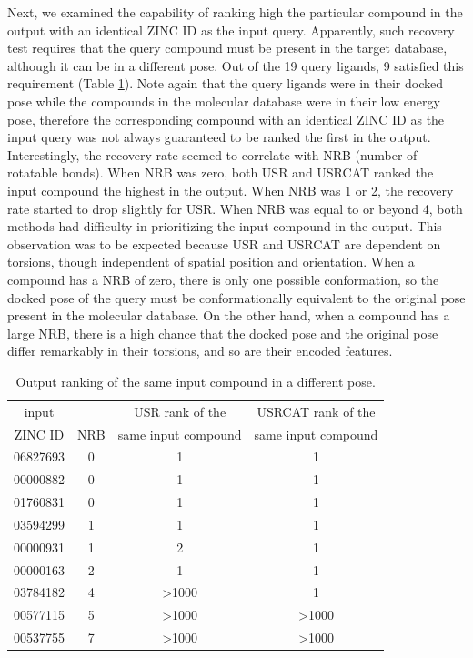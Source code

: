 Next, we examined the capability of ranking high the particular compound in the output with an identical ZINC ID as the input query. Apparently, such recovery test requires that the query compound must be present in the target database, although it can be in a different pose. Out of the 19 query ligands, 9 satisfied this requirement (Table \ref{usr:RecoveryRate}). Note again that the query ligands were in their docked pose while the compounds in the molecular database were in their low energy pose, therefore the corresponding compound with an identical ZINC ID as the input query was not always guaranteed to be ranked the first in the output. Interestingly, the recovery rate seemed to correlate with NRB (number of rotatable bonds). When NRB was zero, both USR and USRCAT ranked the input compound the highest in the output. When NRB was 1 or 2, the recovery rate started to drop slightly for USR. When NRB was equal to or beyond 4, both methods had difficulty in prioritizing the input compound in the output. This observation was to be expected because USR and USRCAT are dependent on torsions, though independent of spatial position and orientation. When a compound has a NRB of zero, there is only one possible conformation, so the docked pose of the query must be conformationally equivalent to the original pose present in the molecular database. On the other hand, when a compound has a large NRB, there is a high chance that the docked pose and the original pose differ remarkably in their torsions, and so are their encoded features.

\begin{table}
\caption{Output ranking of the same input compound in a different pose.}
\label{usr:RecoveryRate}
\begin{tabular}{cccc}
\hline
input    &     & USR rank of the     & USRCAT rank of the\\
ZINC ID  & NRB & same input compound & same input compound\\
\hline
06827693 &   0 &     1 &     1\\
00000882 &   0 &     1 &     1\\
01760831 &   0 &     1 &     1\\
03594299 &   1 &     1 &     1\\
00000931 &   1 &     2 &     1\\
00000163 &   2 &     1 &     1\\
03784182 &   4 & >1000 &     1\\
00577115 &   5 & >1000 & >1000\\
00537755 &   7 & >1000 & >1000\\
\hline
\end{tabular}
\end{table}

